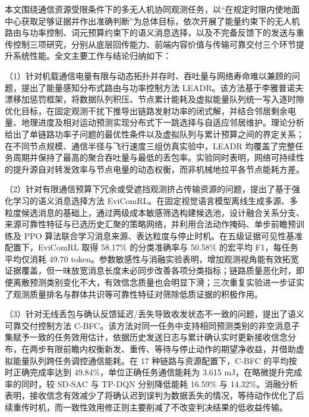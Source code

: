 \begin{conclusions}
\label{ch:conclusion}

本文围绕通信资源受限条件下的多无人机协同观测任务，以“在规定时限内使地面中心获取足够证据并作出准确判断”为总体目标，依次开展了能量约束下的无人机路由与功率控制、词元预算约束下的语义消息选择，以及不完备反馈下的发送与重传控制三项研究，分别从底层回传能力、前端内容价值与传输可靠交付三个环节提升系统性能。全文主要工作与结论归纳如下：

（1）针对机载通信电量有限与动态拓扑并存时、吞吐量与网络寿命难以兼顾的问题，提出了能量感知分布式路由与功率控制方法 LEADR。该方法基于李雅普诺夫漂移加惩罚框架，将数据队列积压、节点累计能耗及虚拟能量队列统一写入逐时隙优化目标，在固定观测干扰下推导出链路发射功率的闭式解，并结合邻居剩余电量、地理进度及相对运动预测实现分布式下一跳选择与自适应邻居维护。理论分析给出了单链路功率子问题的最优性条件以及虚拟队列与累计预算之间的界定关系；在不同节点规模、通信半径与飞行速度三组仿真实验中，LEADR 均覆盖了完整任务周期并保持了最高的聚合吞吐量与最低的丢包率。实验同时表明，网络可持续性的提升源自对转发效率与节点电量的动态权衡，而非机械地拉平各节点能耗方差。

（2）针对有限通信预算下冗余或受遮挡观测挤占传输资源的问题，提出了基于强化学习的语义消息选择方法 EviComRL。在固定视觉语言模型离线生成多源、多粒度候选消息的基础上，通过两级成本敏感筛选构建候选池，设计融合关系分支、来源可靠性特征与已选历史汇聚的策略网络，并利用合法动作掩码、单步前瞻预训练及 PPO 算法联合学习消息来源、表达粒度与停止时机。在五级证据可见性基准配置下，EviComRL 取得 58.17\% 的分类准确率与 50.58\% 的宏平均 F1，每任务平均仅消耗 49.70 token。参数敏感性与消融实验表明，增加观测视角能有效拓宽证据覆盖，但一味放宽消息长度未必同步改善各项分类指标；链路质量恶化时，即便离散预测类别变化不大，有效信念质量也会明显下滑；三次重复实验进一步证实了观测质量排名与群体共识等可靠性特征对筛除低质证据的积极作用。

（3）针对无线丢包与确认反馈延迟/丢失导致收发状态不一致的问题，提出了语义可靠交付控制方法 C-BFC。该方法对同一任务中支持相同预测类别的非空消息子集赋予一致的任务效用估计，依据历史发送日志与累计确认实时更新接收信念分布，在两步有限前瞻内权衡新发、重传、等待与停止动作的期望净收益，并借助虚拟能量队列跨任务调控通信能耗。在 17 种链路与资源配置下，C-BFC 的平均按时正确完成率达到 49.84\%，单位正确任务通信能耗为 3.615 mJ，在略微提升完成率的同时，较 SD-SAC 与 TP-DQN 分别降低能耗 16.59\% 与 14.32\%。消融分析表明，接收信念有效减少了将确认迟到误判为数据丢失的情况，等待动作优化了后续重传时机，而一致性效用修正则主要削减了不改变判决结果的低收益传输。
\end{conclusions}